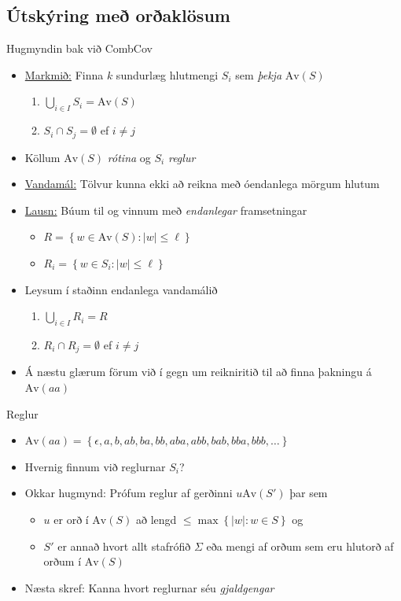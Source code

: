 \documentclass[icelandic]{beamer}
\newcommand{\Av}{\mathrm{Av}}
\newcommand{\CombCov}{\textsf{CombCov}}
\begin{document}
\subsection{Útskýring með orðaklösum}
\begin{frame}{Hugmyndin bak við \CombCov}
  \begin{itemize}[<+->]
    \item \underline{Markmið:} Finna $k$ sundurlæg hlutmengi $S_i$ sem \emph{þekja} $\Av(S)$
    \begin{enumerate}[(1)]
      \item $\bigcup_{i \in I}{S_i} = \Av(S)$
      \item $S_i \cap S_j = \emptyset$ ef $i \neq j$
    \end{enumerate}
    \item Köllum $\Av(S)$ \emph{rótina} og $S_i$ \emph{reglur}
    \item \underline{Vandamál:} Tölvur kunna ekki að reikna með óendanlega mörgum hlutum
    \item \underline{Lausn:} Búum til og vinnum með \emph{endanlegar} framsetningar
    \begin{itemize}
      \item $R = \left \{ w \in \Av(S) \colon |w| \leq \ell \right \}$
      \item $R_i = \left \{ w \in S_i \colon |w| \leq \ell \right \}$
    \end{itemize}
    \item Leysum í staðinn endanlega vandamálið
    \begin{enumerate}[(1)]
      \item $\bigcup_{i \in I}{R_i} = R$
      \item $R_i \cap R_j = \emptyset$ ef $i \neq j$
    \end{enumerate}
    \item Á næstu glærum förum við í gegn um reikniritið til að finna þakningu á $\Av(aa)$
  \end{itemize}
\end{frame}

\begin{frame}{Reglur}
  \begin{itemize}[<+->]
    \item $\Av(aa) = \left\{ \epsilon, a, b, ab, ba, bb, aba, abb, bab, bba, bbb, \ldots \right\}$
    \item Hvernig finnum við reglurnar $S_i$?
    \item Okkar hugmynd: Prófum reglur af gerðinni $u \Av(S')$ þar sem
      \begin{itemize}
        \item $u$ er orð í $\Av(S)$ að lengd $\leq \max \left \{ |w| \colon w \in S \right\}$ og 
        \item $S'$ er annað hvort allt stafrófið $\Sigma$ eða mengi af orðum sem eru hlutorð af orðum í $\Av(S)$
      \end{itemize}
    \item Næsta skref: Kanna hvort reglurnar séu \emph{gjaldgengar}
  \end{itemize}
\end{frame}
\end{document}
